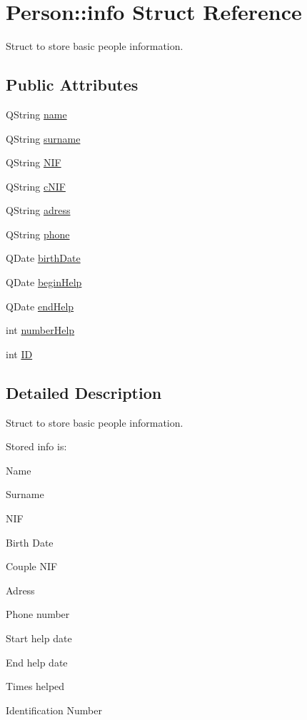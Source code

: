 \hypertarget{struct_person_1_1info}{\section{Person\+:\+:info Struct Reference}
\label{struct_person_1_1info}
}


Struct to store basic people information.  


\subsection*{Public Attributes}
\begin{DoxyCompactItemize}
\item 
Q\+String \hyperlink{struct_person_1_1info_a8ab46165bb77b7882e956aba3101fa85}{name}
\item 
Q\+String \hyperlink{struct_person_1_1info_acf04a7168c9c5d559f2503f5c0dfe617}{surname}
\item 
Q\+String \hyperlink{struct_person_1_1info_ad60a1409eef3fa675d378d34f0a23318}{N\+I\+F}
\item 
Q\+String \hyperlink{struct_person_1_1info_a05bf59483c45d0cefac792cd143746b3}{c\+N\+I\+F}
\item 
Q\+String \hyperlink{struct_person_1_1info_a9842940ff9863d4643bedb4c1c3a66bb}{adress}
\item 
Q\+String \hyperlink{struct_person_1_1info_a410d9f283db98b67f3110be9080767a5}{phone}
\item 
Q\+Date \hyperlink{struct_person_1_1info_ae35b9afac92191fa90ba28dce704c4de}{birth\+Date}
\item 
Q\+Date \hyperlink{struct_person_1_1info_a77c4910695598cdba10e16081b858860}{begin\+Help}
\item 
Q\+Date \hyperlink{struct_person_1_1info_a1b774280eaa544c6cd8664f1d4797b6e}{end\+Help}
\item 
int \hyperlink{struct_person_1_1info_a6e17da0b05d6604b18d759363eecfc9f}{number\+Help}
\item 
int \hyperlink{struct_person_1_1info_a50a0afa03e7717b606892e8bfa9100da}{I\+D}
\end{DoxyCompactItemize}


\subsection{Detailed Description}
Struct to store basic people information. 

Stored info is\+: 
\begin{DoxyItemize}
\item Name 
\item Surname 
\item N\+I\+F 
\item Birth Date 
\item Couple N\+I\+F 
\item Adress 
\item Phone number 
\item Start help date 
\item End help date 
\item Times helped 
\item Identification Number 
\end{DoxyItemize}

